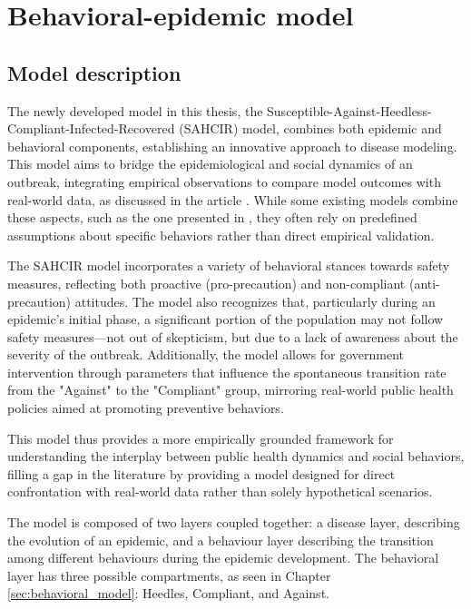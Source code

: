 \chapter{Behavioral-epidemic model}
\label{ch:epi_behav_model}
\section{Model description}

The newly developed model in this thesis, the Susceptible-Against-Heedless-Compliant-Infected-Recovered (SAHCIR) model, combines both epidemic and behavioral components, establishing an innovative approach to disease modeling. This model aims to bridge the epidemiological and social dynamics of an outbreak, integrating empirical observations to compare model outcomes with real-world data, as discussed in the article \cite{Proverbio_Tex_2024}. While some existing models combine these aspects, such as the one presented in \cite{Bulai2023}, they often rely on predefined assumptions about specific behaviors rather than direct empirical validation.

The SAHCIR  model incorporates a variety of behavioral stances towards safety measures, reflecting both proactive (pro-precaution) and non-compliant (anti-precaution) attitudes. The model also recognizes that, particularly during an epidemic's initial phase, a significant portion of the population may not follow safety measures—not out of skepticism, but due to a lack of awareness about the severity of the outbreak. Additionally, the model allows for government intervention through parameters that influence the spontaneous transition rate from the "Against" to the "Compliant" group, mirroring real-world public health policies aimed at promoting preventive behaviors. 

This model thus provides a more empirically grounded framework for understanding the interplay between public health dynamics and social behaviors, filling a gap in the literature by providing a model designed for direct confrontation with real-world data rather than solely hypothetical scenarios.


The model is composed of two layers coupled together: a disease layer, describing the evolution of an epidemic, and a behaviour layer describing the transition among different behaviours during the epidemic development.
The behavioral layer has three possible compartments, as seen in Chapter \ref{sec:behavioral_model}: Heedles, Compliant, and Against.

